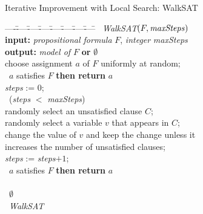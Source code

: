 %   
% 
% 
% 
% 
% 
% 
\begin{frame}[c]{Iterative Improvement with Local Search: WalkSAT\\ }

\smallskip
{\footnotesize
\begin{tabbing}
----\=----\=----\=----\=----\=----\=----\=----\=\kill
\pscProc\ {\em WalkSAT$(F,\mbox{\emph{maxSteps}})$}\\
\> {\bf input:} {\em propositional formula} $F$, \emph{integer} \emph{maxSteps}\\
\> {\bf output:} {\em model of $F$} {\bf or} $\emptyset$\\[1mm]
\> choose assignment $a$ of $F$ uniformly at random;\\
\> \pscIf\ $a$ satisfies $F$ \textbf{then return} $a$\\
\> \emph{steps} := 0; \\
\> \pscWhile\ (\emph{steps} $<$ \emph{maxSteps}) \pscDo\\
\> \> randomly select an unsatisfied clause $C$;\\ 
\> \> randomly select a variable $v$ that appears in $C$;\\ 
\> \> change the value of $v$ and keep the change unless it\\
\> \> increases the number of unsatisfied clauses;\\ 
\> \> \emph{steps} := \emph{steps}$+1$;\\
\> \> \pscIf\ $a$ satisfies $F$ \textbf{then return} $a$\\
\> \pscEnd\\
\> \pscReturn\ $\emptyset$\\
\pscEnd\ {\em WalkSAT}
\end{tabbing}
}
\end{frame}
